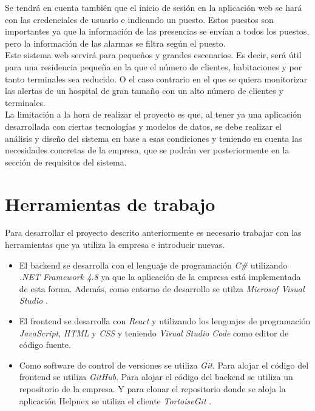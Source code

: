 Se tendrá en cuenta también que el inicio de sesión en la aplicación web se hará con las credenciales de usuario e indicando un puesto. Estos puestos son importantes ya que la información de las presencias se envían a todos los puestos, pero la información de las alarmas se filtra según el puesto.\\

Este sistema web servirá para pequeños y grandes escenarios. Es decir, será útil para una residencia pequeña en la que el número de clientes, habitaciones y por tanto terminales sea reducido. O el caso contrario en el que se quiera monitorizar las alertas de un hospital de gran tamaño con un alto número de clientes y terminales.\\


La limitación a la hora de realizar el proyecto es que, al tener ya una aplicación desarrollada con ciertas tecnologías y modelos de datos, se debe realizar el análisis y diseño del sistema en base a esas condiciones y teniendo en cuenta las necesidades concretas de la empresa, que se podrán ver posteriormente en la sección de requisitos del sistema.


\section{Herramientas de trabajo}


Para desarrollar el proyecto descrito anteriormente es necesario trabajar con las herramientas que ya utiliza la empresa e introducir nuevas.

\begin{itemize}
    \item El backend se desarrolla con el lenguaje de programación \textit{C\#} utilizando \textit{.NET Framework 4.8} \cite{net-framework} ya que la aplicación de la empresa está implementada de esta forma. Además, como entorno de desarrollo se utilza \textit{Microsof Visual Studio} \cite{vs}.
    \item El frontend se desarrolla con \textit{React} \cite{react} y utilizando los lenguajes de programación \textit{JavaScript}, \textit{HTML} y \textit{CSS} y teniendo \textit{Visual Studio Code} \cite{vscode} como editor de código fuente.
    \item Como software de control de versiones se utiliza \textit{Git}. Para alojar el código del frontend se utiliza \textit{GitHub}. Para alojar el código del backend se utiliza un repositorio de la empresa. Y para clonar el repositorio donde se aloja la aplicación Helpnex se utiliza el cliente \textit{TortoiseGit} \cite{tortoise-git}.
\end{itemize}

